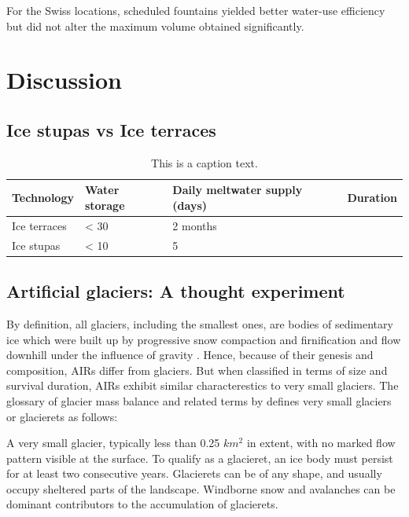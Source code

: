 For the Swiss locations, scheduled fountains yielded better water-use efficiency but did not alter the maximum
volume obtained significantly. 


\section{Discussion}
\subsection{Ice stupas vs Ice terraces}

\begin{table}[htb]
	\begin{tabularx}{\textwidth}{X | X | X | X}
		\hline
    \textbf{Technology}& \textbf{Water storage}& \textbf{Daily meltwater supply (days)}& \textbf{Duration} \\
    \hline
		Ice terraces			& < 30				     & 2 months				\\
    Ice stupas        & < 10             & 5				\\
		\hline
	\end{tabularx}
	\label{tab:table1}
	\caption{This is a caption text.}
\end{table}

\subsection{Artificial glaciers: A thought experiment}

By definition, all glaciers, including the smallest ones, are bodies of sedimentary ice which were built up by
progressive snow compaction and firnification and flow downhill under the influence of gravity
\cite{benndouglasiGlaciersGlaciation2014}. Hence, because of their genesis and composition, AIRs differ from
glaciers. But when classified in terms of size and survival duration, AIRs exhibit similar characterestics to
very small glaciers. The glossary of glacier mass balance and related terms by
\citet{cogleyGlossaryGlacierMass2010} defines very small glaciers or glacierets as follows:

\begin{thesis_quotation}
  A very small glacier, typically less than 0.25 $km^2$ in extent, with no marked flow pattern
  visible at the surface. To qualify as a glacieret, an ice body must persist for at least two consecutive
  years. Glacierets can be of any shape, and usually occupy sheltered parts of the landscape. Windborne snow and
  avalanches can be dominant contributors to the accumulation of glacierets. 
\end{thesis_quotation}

